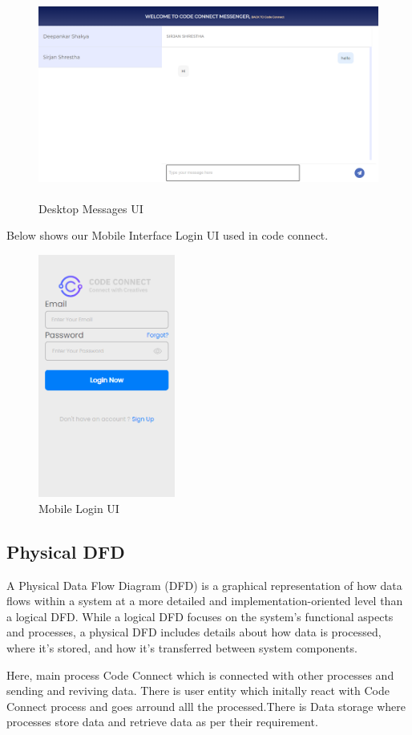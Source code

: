 \begin{figure}[H]
  \centering
  \includegraphics[height = 6.8cm]{Outcome-ss/messenger-full-block.png}
  \caption{Desktop Messages UI}
\end{figure}
\newpage
Below shows our Mobile Interface Login UI used in code connect.
\begin{figure}[H]
  \centering
  \includegraphics[height = 8cm]{ui_diagrams/mobile_login.png}
  \caption{Mobile Login UI}
\end{figure}
\newpage
\subsection{Physical DFD}
A Physical Data Flow Diagram (DFD) is a graphical representation of how data flows within a system at a more detailed and implementation-oriented level than a logical DFD. While a logical DFD focuses on the system's functional aspects and processes, a physical DFD includes details about how data is processed, where it's stored, and how it's transferred between system components.

Here, main process Code Connect which is connected with other processes and sending and reviving data. There is user entity which initally react with Code Connect process and goes arround alll the processed.There is Data storage where processes store data and retrieve data as per their requirement.

